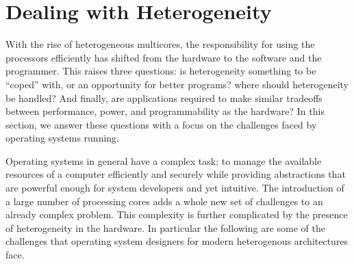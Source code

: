 \section{Dealing with Heterogeneity}

With the rise of heterogeneous multicores, the responsibility
for using the processors efficiently has shifted from the hardware
to the software and the programmer. This raises three questions:
is heterogeneity something to be ``coped'' with, or an opportunity for
better programs? where should heterogeneity be handled? And finally,
are applications required to make similar tradeoffs between
performance, power, and programmability as the hardware?
In this section, we answer these questions with a focus on the
challenges faced by operating systems running.

Operating systems in general have a complex task; to manage the available
resources of a computer efficiently and securely while providing abstractions
that are powerful enough for system developers and yet intuitive. The
introduction of a large number of processing cores adds a whole new set of
challenges to an already complex problem. This complexity is further complicated
by the presence of heterogeneity in the hardware. In particular the following
are some of the challenges that operating system designers for modern heterogenous
architectures face.

